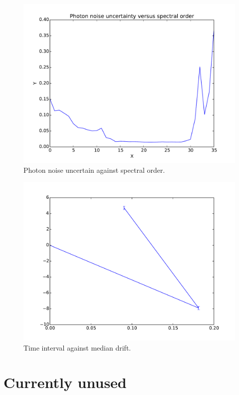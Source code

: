 \begin{figure}
\begin{center}
\includegraphics[width=.8\textwidth]{figures/cal_DRIFT_RAW_spirou_2}
\caption{Photon noise uncertain against spectral order. \label{figure:cal_DRIFT_RAW_spirou_2}}
\end{center}
\end{figure}

\begin{figure}
\begin{center}
\includegraphics[width=.8\textwidth]{figures/cal_DRIFT_RAW_spirou_3}
\caption{Time interval against median drift. \label{figure:cal_DRIFT_RAW_spirou_3}}
\end{center}
\end{figure}

\clearpage
\newpage
\section{Currently unused}

